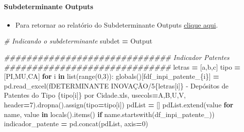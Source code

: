 \documentclass[
  12,
  dvipsnames]{article}
\newenvironment{Shaded}{\begin{snugshade}}{\end{snugshade}}
\newcommand{\BuiltInTok}[1]{#1}
\newcommand{\CommentTok}[1]{\textcolor[rgb]{0.56,0.35,0.01}{\textit{#1}}}
\newcommand{\ControlFlowTok}[1]{\textcolor[rgb]{0.13,0.29,0.53}{\textbf{#1}}}
\newcommand{\DecValTok}[1]{\textcolor[rgb]{0.00,0.00,0.81}{#1}}
\newcommand{\KeywordTok}[1]{\textcolor[rgb]{0.13,0.29,0.53}{\textbf{#1}}}
\newcommand{\NormalTok}[1]{#1}
\newcommand{\OperatorTok}[1]{\textcolor[rgb]{0.81,0.36,0.00}{\textbf{#1}}}
\newcommand{\SpecialCharTok}[1]{\textcolor[rgb]{0.00,0.00,0.00}{#1}}
\newcommand{\SpecialStringTok}[1]{\textcolor[rgb]{0.31,0.60,0.02}{#1}}
\newcommand{\StringTok}[1]{\textcolor[rgb]{0.31,0.60,0.02}{#1}}
\providecommand{\tightlist}{%
  \setlength{\itemsep}{0pt}\setlength{\parskip}{0pt}}
\begin{document}
\hypertarget{script_2.5.2}{%
\paragraph{Subdeterminante Outputs}\label{script_2.5.2}}

\begin{itemize}
\tightlist
\item
  Para retornar ao relatório do Subdeterminante Outputs
  \protect\hyperlink{subdet_output}{clique aqui}.
\end{itemize}

\begin{Shaded}
\begin{Highlighting}[]
\CommentTok{\# Indicando o subdeterminante}
\NormalTok{subdet }\OperatorTok{=} \StringTok{\textquotesingle{}Output\textquotesingle{}}

\CommentTok{\#\#\#\#\#\#\#\#\#\#\#\#\#\#\#\#\#\#\#\#\#\#\#\#\#\#\#\#\#\# Indicador Patentes \#\#\#\#\#\#\#\#\#\#\#\#\#\#\#\#\#\#\#\#\#\#\#\#\#\#\#\#\#\#}
\NormalTok{letras }\OperatorTok{=}\NormalTok{ [}\StringTok{\textquotesingle{}a\textquotesingle{}}\NormalTok{,}\StringTok{\textquotesingle{}b\textquotesingle{}}\NormalTok{,}\StringTok{\textquotesingle{}c\textquotesingle{}}\NormalTok{]}
\NormalTok{tipo }\OperatorTok{=}\NormalTok{ [}\StringTok{\textquotesingle{}PI\textquotesingle{}}\NormalTok{,}\StringTok{\textquotesingle{}MU\textquotesingle{}}\NormalTok{,}\StringTok{\textquotesingle{}CA\textquotesingle{}}\NormalTok{]}
\ControlFlowTok{for}\NormalTok{ i }\KeywordTok{in} \BuiltInTok{list}\NormalTok{(}\BuiltInTok{range}\NormalTok{(}\DecValTok{0}\NormalTok{,}\DecValTok{3}\NormalTok{)):}
    \BuiltInTok{globals}\NormalTok{()[}\SpecialStringTok{f\textquotesingle{}df\_inpi\_patente\_}\SpecialCharTok{\{}\NormalTok{i}\SpecialCharTok{\}}\SpecialStringTok{\textquotesingle{}}\NormalTok{] }\OperatorTok{=}\NormalTok{ pd.read\_excel(}\SpecialStringTok{f\textquotesingle{}DETERMINANTE INOVAÇÃO/5}\SpecialCharTok{\{}\NormalTok{letras[i]}\SpecialCharTok{\}}\SpecialStringTok{ {-} Depósitos de Patentes do Tipo }\SpecialCharTok{\{}\NormalTok{tipo[i]}\SpecialCharTok{\}}\SpecialStringTok{ por Cidade.xls\textquotesingle{}}\NormalTok{,}
\NormalTok{                                     usecols}\OperatorTok{=}\StringTok{\textquotesingle{}A,B,U,V\textquotesingle{}}\NormalTok{, header}\OperatorTok{=}\DecValTok{7}\NormalTok{).dropna().assign(tipo}\OperatorTok{=}\NormalTok{tipo[i])}
\NormalTok{    pdList }\OperatorTok{=}\NormalTok{ []}
\NormalTok{    pdList.extend(value }\ControlFlowTok{for}\NormalTok{ name, value }\KeywordTok{in} \BuiltInTok{locals}\NormalTok{().items() }\ControlFlowTok{if}\NormalTok{ name.startswith(}\StringTok{\textquotesingle{}df\_inpi\_patente\_\textquotesingle{}}\NormalTok{))}
\NormalTok{    indicador\_patente }\OperatorTok{=}\NormalTok{ pd.concat(pdList, axis}\OperatorTok{=}\DecValTok{0}\NormalTok{)}


\end{Highlighting}
\end{Shaded}
\end{document}
